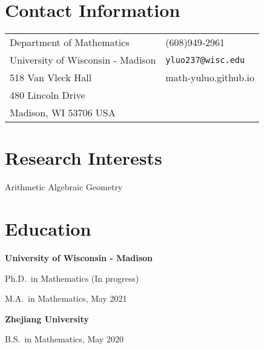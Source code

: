 \documentclass[margin,line,pifont,palatino,courier]{res}
\newenvironment{list1}{
  \begin{list}{\ding{113}}{%
      \setlength{\itemsep}{0in}
      \setlength{\parsep}{0in} \setlength{\parskip}{0in}
      \setlength{\topsep}{0in} \setlength{\partopsep}{0in}
      \setlength{\leftmargin}{0.17in}}}{\end{list}}
\begin{document}

\begin{resume}

\section{\sc Contact Information}

\vspace{.05in}
\begin{tabular}{@{}p{2.75in}p{2in}}
Department of Mathematics & (608)949-2961 \\
University of Wisconsin - Madison                      & \verb+yluo237@wisc.edu+\\
518 Van Vleck Hall                 & 
math-yuluo.github.io\\
480 Lincoln Drive               & \\
Madison, WI 53706 USA               & \\
\end{tabular}


\section{\sc Research Interests}
Arithmetic Algebraic Geometry

\section{\sc Education}

{\bf University of Wisconsin - Madison}\\
\vspace*{-.1in}
\begin{list1}
\item[] Ph.D.~in Mathematics (In progress)


\item[] M.A.~in Mathematics, May 2021
\end{list1}

{\bf Zhejiang University}\\
\vspace*{-.1in}
\begin{list1}
\item[] B.S.~in Mathematics, May 2020

\end{list1}








\end{resume}
\end{document}
